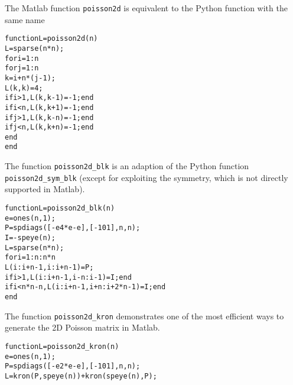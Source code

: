 \documentclass[a4paper]{article}
\newlength{\pyindent} \newlength{\pyminipagewidth}
\newenvironment{pycode}{\begin{trivlist}\item\hspace*{\pyindent}\begin{minipage}{\pyminipagewidth}\small\begin{alltt}}
      {\end{alltt}\end{minipage}\end{trivlist}}
\begin{document}
The Matlab function \texttt{poisson2d} is equivalent to the Python
function with the same name
\begin{pycode}
function L = poisson2d(n)
  L = sparse(n*n);
  for i = 1:n
    for j = 1:n
      k = i + n*(j-1);
      L(k,k) = 4;
      if i > 1, L(k,k-1) = -1; end
      if i < n, L(k,k+1) = -1; end
      if j > 1, L(k,k-n) = -1; end
      if j < n, L(k,k+n) = -1; end
    end
  end
\end{pycode}
\begin{sloppypar}
  The function \texttt{poisson2d\_blk} is an adaption of the Python
  function \texttt{poisson2d\_sym\_blk} (except for exploiting the
  symmetry, which is not directly supported in Matlab).
\end{sloppypar}
\begin{pycode}
function L = poisson2d_blk(n)
  e = ones(n,1);
  P = spdiags([-e 4*e -e], [-1 0 1], n, n);
  I = -speye(n);
  L = sparse(n*n);
  for i = 1:n:n*n
    L(i:i+n-1,i:i+n-1) = P;
    if i > 1, L(i:i+n-1,i-n:i-1) = I; end
    if i < n*n - n, L(i:i+n-1,i+n:i+2*n-1) = I; end
  end
\end{pycode}
\noindent The function \texttt{poisson2d\_kron} demonstrates one of the most efficient 
ways to generate the 2D Poisson matrix in Matlab.
\begin{pycode}
function L = poisson2d_kron(n)
  e = ones(n,1);
  P = spdiags([-e 2*e -e], [-1 0 1], n, n);
  L = kron(P, speye(n)) + kron(speye(n), P);
\end{pycode}
\end{document}
